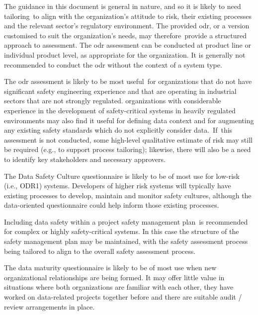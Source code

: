 The guidance in this document is general in nature, and so it is \cbstart likely to need tailoring\cbend\ to align with the organization's attitude to risk, their existing processes and the relevant sector's regulatory environment. \cbstart The provided \gls{odr}, or a version customised to suit the organization's needs, may therefore\cbend\ provide a structured approach to assessment.
The \gls{odr} assessment can be conducted at product line or individual product level, as appropriate for the organization. It is generally not recommended to conduct the \gls{odr} without the context of a system type.

\cbstart The \gls{odr} assessment is likely to be most useful\cbend\ for organizations that do not have significant safety engineering experience and that are operating in \cbstart industrial sectors that are not strongly regulated\cbend.
organizations with considerable experience in the development of safety-critical systems in heavily regulated environments
may also find it \cbstart useful for defining data context and for augmenting any existing safety standards which do not explicitly consider data.\cbend\
\cbstart If\cbend\ this assessment is not conducted, some high-level qualitative estimate of risk may still be required (e.g., to support process tailoring); likewise, there will also be a need to identify key \glspl{stakeholder} and necessary approvers.

\cbstart The Data Safety Culture questionnaire is likely to be of most use for low-risk (i.e., ODR1) systems. Developers of higher risk systems will typically have existing processes to develop, maintain and monitor safety cultures, although the data-oriented questionnaire could help inform those existing processes\cbend.

\cbstart Including data safety within a project safety management plan\cbend\ is recommended for complex or highly safety-critical systems. In this case the structure of the safety management plan may be maintained, with the \gls{safety assessment} process being tailored to align to the overall safety assessment process.

The \cbstart data maturity questionnaire is likely to be of most use when new organizational relationships are being formed. It may offer little value in situations where both organizations are familiar with each other, they have worked on data-related projects together before and there are suitable audit / review arrangements in place\cbend.

